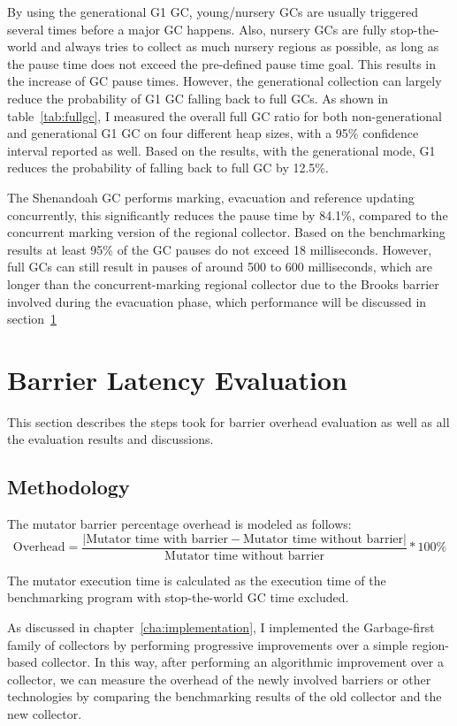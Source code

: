 By using the generational G1 GC, young/nursery GCs are usually triggered several times
before a major GC happens. Also, nursery GCs are fully stop-the-world and always tries
to collect as much nursery regions as possible, as long as the pause time does not exceed
the pre-defined pause time goal. This results in the increase of GC pause times.
However, the generational collection can largely reduce the probability of G1 GC falling
back to full GCs. As shown in table~\ref{tab:fullgc}, I measured the overall full GC ratio
for both non-generational and generational G1 GC on four different heap sizes,
with a 95\% confidence interval reported as well.
Based on the results, with the generational mode, G1 reduces the
probability of falling back to full GC by 12.5\%.

The Shenandoah GC performs marking, evacuation and reference updating concurrently,
this significantly reduces the pause time by 84.1\%, compared to the concurrent marking version
of the regional collector. Based on the benchmarking results at least 95\% of
the GC pauses do not exceed 18 milliseconds. However, full GCs can still result
in pauses of around 500 to 600 milliseconds, which are longer than the concurrent-marking
regional collector due to the Brooks barrier involved during the evacuation phase, which performance
will be discussed in section~\ref{sec:barrierlatency}

\section{Barrier Latency Evaluation} %
\label{sec:barrierlatency}

This section describes the steps took for barrier overhead evaluation as well as
all the evaluation results and discussions.

\subsection{Methodology}

The mutator barrier percentage overhead is modeled as follows:
$$
\text{Overhead} = \frac{|\text{Mutator time with barrier} - \text{Mutator time without barrier}|}{\text{Mutator time without barrier}} * 100\%
$$

The mutator execution time is calculated as the execution time of the benchmarking program with
stop-the-world GC time excluded.

As discussed in chapter~\ref{cha:implementation}, I implemented the Garbage-first
family of collectors by performing progressive improvements over a simple region-based collector.
In this way, after performing an algorithmic improvement over a collector, we can measure the overhead of
the newly involved barriers or other technologies by comparing the benchmarking results
of the old collector and the new collector.

